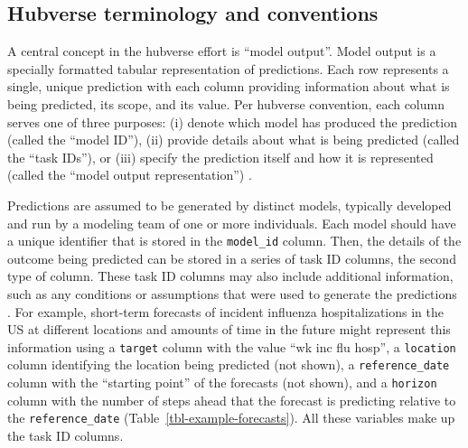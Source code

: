 \documentclass[
  article,
  shortnames,
  notitle]{jss}
\begin{document}
\subsection{Hubverse terminology and
conventions}\label{hubverse-terminology-and-conventions}

A central concept in the hubverse effort is ``model output''. Model
output is a specially formatted tabular representation of predictions.
Each row represents a single, unique prediction with each column
providing information about what is being predicted, its scope, and its
value. Per hubverse convention, each column serves one of three
purposes: (i) denote which model has produced the prediction (called the
``model ID''), (ii) provide details about what is being predicted
(called the ``task IDs''), or (iii) specify the prediction itself and
how it is represented (called the ``model output representation'')
\citep{hubverse_docs}.

Predictions are assumed to be generated by distinct models, typically
developed and run by a modeling team of one or more individuals. Each
model should have a unique identifier that is stored in the
\texttt{model\_id} column. Then, the details of the outcome being
predicted can be stored in a series of task ID columns, the second type
of column. These task ID columns may also include additional
information, such as any conditions or assumptions that were used to
generate the predictions \citep{hubverse_docs}. For example, short-term
forecasts of incident influenza hospitalizations in the US at different
locations and amounts of time in the future might represent this
information using a \texttt{target} column with the value ``wk inc flu
hosp'', a \texttt{location} column identifying the location being
predicted (not shown), a \texttt{reference\_date} column with the
``starting point'' of the forecasts (not shown), and a \texttt{horizon}
column with the number of steps ahead that the forecast is predicting
relative to the \texttt{reference\_date}
(Table~\ref{tbl-example-forecasts}). All these variables make up the
task ID columns.
\end{document}
